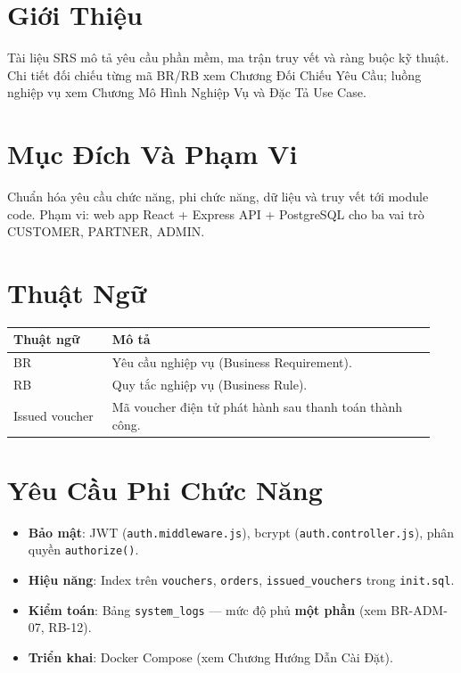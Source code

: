 \section{Giới Thiệu}
Tài liệu SRS mô tả yêu cầu phần mềm, ma trận truy vết và ràng buộc kỹ thuật. Chi tiết đối chiếu từng mã BR/RB xem Chương Đối Chiếu Yêu Cầu; luồng nghiệp vụ xem Chương Mô Hình Nghiệp Vụ và Đặc Tả Use Case.

\section{Mục Đích Và Phạm Vi}
Chuẩn hóa yêu cầu chức năng, phi chức năng, dữ liệu và truy vết tới module code. Phạm vi: web app React + Express API + PostgreSQL cho ba vai trò CUSTOMER, PARTNER, ADMIN.

\section{Thuật Ngữ}
\begin{longtable}{>{\raggedright\arraybackslash}p{0.22\linewidth}>{\raggedright\arraybackslash}p{0.72\linewidth}}
\toprule
\textbf{Thuật ngữ} & \textbf{Mô tả}\\
\midrule
BR & Yêu cầu nghiệp vụ (Business Requirement).\\
RB & Quy tắc nghiệp vụ (Business Rule).\\
Issued voucher & Mã voucher điện tử phát hành sau thanh toán thành công.\\
\bottomrule
\end{longtable}

\section{Yêu Cầu Phi Chức Năng}
\begin{itemize}[leftmargin=1.2cm]
  \item \textbf{Bảo mật}: JWT (\texttt{auth.middleware.js}), bcrypt (\texttt{auth.controller.js}), phân quyền \texttt{authorize()}.
  \item \textbf{Hiệu năng}: Index trên \texttt{vouchers}, \texttt{orders}, \texttt{issued\_vouchers} trong \texttt{init.sql}.
  \item \textbf{Kiểm toán}: Bảng \texttt{system\_logs} — mức độ phủ \textbf{một phần} (xem BR-ADM-07, RB-12).
  \item \textbf{Triển khai}: Docker Compose (xem Chương Hướng Dẫn Cài Đặt).
\end{itemize}

